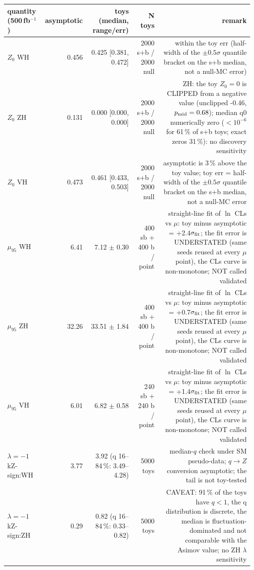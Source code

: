 \begin{table}[ht]\centering\small
\begin{tabular}{lrrrr}\hline
quantity (500\,fb$^{-1}$) & asymptotic & toys (median, range/err) & N toys & remark \\\hline
$Z_0$ WH & 0.456 & 0.425 [0.381, 0.472] & 2000 s+b / 2000 null & within the toy err (half-width of the $\pm0.5\sigma$ quantile bracket on the s+b median, not a null-MC error) \\
$Z_0$ ZH & 0.131 & 0.000 [0.000, 0.000] & 2000 s+b / 2000 null & ZH: the toy $Z_0=0$ is CLIPPED from a negative value (unclipped -0.46, $p_{\rm mid}=0.68$); median q0 numerically zero ($<10^{-6}$ for 61\,\% of s+b toys; exact zeros 31\,\%): no discovery sensitivity \\
$Z_0$ VH & 0.473 & 0.461 [0.433, 0.503] & 2000 s+b / 2000 null & asymptotic is 3\,\% above the toy value; toy err = half-width of the $\pm0.5\sigma$ quantile bracket on the s+b median, not a null-MC error \\
$\mu_{95}$ WH & 6.41 & 7.12 $\pm$ 0.30 & 400 sb + 400 b / point & straight-line fit of $\ln$ CLs vs $\mu$: toy minus asymptotic = +2.4$\sigma_{\rm fit}$; the fit error is UNDERSTATED (same seeds reused at every $\mu$ point), the CLs curve is non-monotone; NOT called validated \\
$\mu_{95}$ ZH & 32.26 & 33.51 $\pm$ 1.84 & 400 sb + 400 b / point & straight-line fit of $\ln$ CLs vs $\mu$: toy minus asymptotic = +0.7$\sigma_{\rm fit}$; the fit error is UNDERSTATED (same seeds reused at every $\mu$ point), the CLs curve is non-monotone; NOT called validated \\
$\mu_{95}$ VH & 6.01 & 6.82 $\pm$ 0.58 & 240 sb + 240 b / point & straight-line fit of $\ln$ CLs vs $\mu$: toy minus asymptotic = +1.4$\sigma_{\rm fit}$; the fit error is UNDERSTATED (same seeds reused at every $\mu$ point), the CLs curve is non-monotone; NOT called validated \\
$\lambda{=}{-}1$ kZ-sign:WH & 3.77 & 3.92 (q 16--84\,\%: 3.49--4.28) & 5000 toys & median-$q$ check under SM pseudo-data; $q\to Z$ conversion asymptotic; the tail is not toy-tested \\
$\lambda{=}{-}1$ kZ-sign:ZH & 0.29 & 0.82 (q 16--84\,\%: 0.33--0.82) & 5000 toys & CAVEAT: 91\,\% of the toys have $q<1$, the q distribution is discrete, the median is fluctuation-dominated and not comparable with the Asimov value; no ZH $\lambda$ sensitivity \\

\end{tabular}
\end{table}
